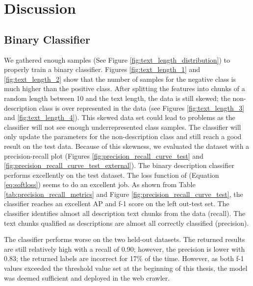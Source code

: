 \documentclass[a4paper, 12pt, oneside]{book} %
\begin{document}
\newpage
\section{Discussion} \label{par:discussion}

\subsection{Binary Classifier}
We gathered enough samples (See Figure \ref{fig:text_length_distribution}) to properly train a binary classifier.
Figures \ref{fig:text_length_1} and \ref{fig:text_length_2} show that the number of samples for the negative class is much higher than the positive class. 
After splitting the features into chunks of a random length between 10 and the text length, the data is still skewed; the non-description class is over represented in the data (see Figures \ref{fig:text_length_3} and \ref{fig:text_length_4}). 
This skewed data set could lead to problems as the classifier will not see enough underrepresented class samples.
The classifier will only update the parameters for the non-description class and still reach a good result on the test data.
Because of this skewness, we evaluated the dataset with a precision-recall plot (Figures \ref{fig:precision_recall_curve_test} and \ref{fig:precision_recall_curve_test_external}).
The binary description classifier performs excellently on the test dataset. 
The loss function of \textcite{reed_training_2015} (Equation \ref{eq:softloss}) seems to do an excellent job.
As shown from Table \ref{tab:precision_recall_metrics} and Figure \ref{fig:precision_recall_curve_test}, the classifier reaches an excellent AP and f-1 score on the left out-test set.
The classifier identifies almost all description text chunks from the data (recall).
The text chunks qualified as descriptions are almost all correctly classified (precision).

The classifier performs worse on the two held-out datasets. 
The returned results are still relatively high with a recall of 0.90; however, the precision is lower with 0.83; the returned labels are incorrect for 17\% of the time.
However, as both f-1 values exceeded the threshold value set at the beginning of this thesis, the model was deemed sufficient and deployed in the web crawler. 
\end{document}
